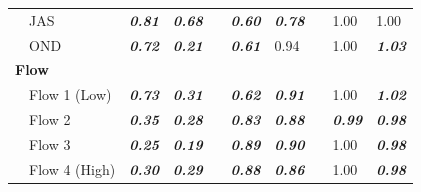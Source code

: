 \documentclass[letterpaper,12pt,oneside]{article}\usepackage[]{graphicx}\usepackage[]{color}
\begin{document}
\begin{table}[!tbp]
\begin{center}
\begin{tabular}{lllcllcll}
~~JAS&{\bf \textit{0.81}}&{\bf \textit{0.68}}&&{\bf \textit{0.60}}&{\bf \textit{0.78}}&&1.00&1.00\tabularnewline
~~OND&{\bf \textit{0.72}}&{\bf \textit{0.21}}&&{\bf \textit{0.61}}&0.94&&1.00&{\bf \textit{1.03}}\tabularnewline
\hline
{\bfseries Flow}&&&&&&&&\tabularnewline
~~Flow 1 (Low)&{\bf \textit{0.73}}&{\bf \textit{0.31}}&&{\bf \textit{0.62}}&{\bf \textit{0.91}}&&1.00&{\bf \textit{1.02}}\tabularnewline
~~Flow 2&{\bf \textit{0.35}}&{\bf \textit{0.28}}&&{\bf \textit{0.83}}&{\bf \textit{0.88}}&&{\bf \textit{0.99}}&{\bf \textit{0.98}}\tabularnewline
~~Flow 3&{\bf \textit{0.25}}&{\bf \textit{0.19}}&&{\bf \textit{0.89}}&{\bf \textit{0.90}}&&1.00&{\bf \textit{0.98}}\tabularnewline
~~Flow 4 (High)&{\bf \textit{0.30}}&{\bf \textit{0.29}}&&{\bf \textit{0.88}}&{\bf \textit{0.86}}&&1.00&{\bf \textit{0.98}}\tabularnewline
\hline
\end{tabular}\end{center}

\end{table}




\end{document}
